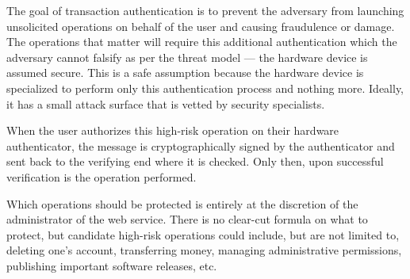 The goal of transaction authentication is to prevent the adversary from launching unsolicited operations on behalf of the user and causing fraudulence or damage. The operations that matter will require this additional authentication which the adversary cannot falsify as per the threat model --- the hardware device is assumed secure. This is a safe assumption because the hardware device is specialized to perform only this authentication process and nothing more. Ideally, it has a small attack surface that is vetted by security specialists. 

When the user authorizes this high-risk operation on their hardware authenticator, the message is cryptographically signed by the authenticator and sent back to the verifying end where it is checked. Only then, upon successful verification is the operation performed. 

Which operations should be protected is entirely at the discretion of the administrator of the web service. There is no clear-cut formula on what to protect, but candidate high-risk operations could include, but are not limited to, deleting one's account, transferring money, managing administrative permissions, publishing important software releases, etc. 






